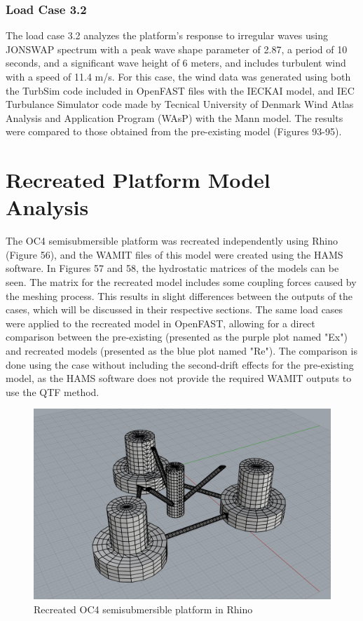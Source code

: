 \documentclass[a4paper, 11pt]{article}
\begin{document}
\subsubsection{Load Case 3.2}  
\hspace*{0.5cm}The load case 3.2 analyzes the platform’s response to irregular waves using JONSWAP spectrum with a peak wave shape parameter of 2.87, a period of 10 seconds, and a significant wave height of 6 meters, and includes turbulent wind with a speed of 11.4 m/s. For this case, the wind data was generated using both the TurbSim code included in OpenFAST files with the IECKAI model, and IEC Turbulance Simulator code made by Tecnical University of Denmark Wind Atlas Analysis and Application Program (WAsP) with the Mann model. The results were compared to those obtained from the pre-existing model (Figures 93-95).


\newpage
\section{Recreated Platform Model Analysis}

\hspace*{0.5cm}The OC4 semisubmersible platform was recreated independently using Rhino (Figure 56), and the WAMIT files of this model were created using the HAMS software. In Figures 57 and 58, the hydrostatic matrices of the models can be seen. The matrix for the recreated model includes some coupling forces caused by the meshing process. This results in slight differences between the outputs of the cases, which will be discussed in their respective sections. The same load cases were applied to the recreated model in OpenFAST, allowing for a direct comparison between the pre-existing (presented as the purple plot named "Ex") and recreated models (presented as the blue plot named "Re"). The comparison is done using the case without including the second-drift effects for the pre-existing model, as the HAMS software does not provide the required WAMIT outputs to use the QTF method.

\begin{figure}[H]
    \centering
    \includegraphics[width=1\textwidth]{rhino.png}
    \caption{\small Recreated OC4 semisubmersible platform in Rhino}
    \label{fig:rhino}
\end{figure}
\end{document}
